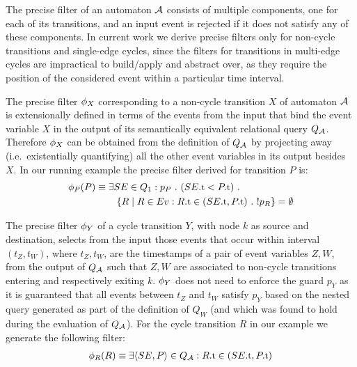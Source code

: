 





The precise filter of an automaton $\mathcal{A}$ consists of multiple components, one 
for each of its transitions, and an input event is rejected if it does not 
satisfy any of these components. 
In current work we derive precise filters only for non-cycle transitions and 
single-edge cycles, since the filters for transitions in multi-edge cycles 
are impractical to build/apply and abstract over, as they require the position 
of the considered event within a particular time interval.
 

The precise filter $\phi_{X}$ corresponding to a non-cycle transition $X$ of 
automaton $\mathcal{A}$ is extensionally defined in terms of the events 
from the input that bind the event variable $X$ in the output of its 
semantically equivalent relational query $Q_{\mathcal{A}}$. 
Therefore $\phi_{X}$ can be obtained from the definition of $Q_{\mathcal{A}}$ by 
projecting away (i.e.\ existentially quantifying) all the other event variables 
in its output besides $X$. 
In our running example the precise filter derived for transition $P$ is:
\begin{align*}
&\precs{P}(P) \equiv \exists SE \in Q_1:
p_P\ .\ (\facc{SE}{t} < \facc{P}{t})\ . 
\\ 
&\qqquad\quad
\{ R \mid R \in \Ev : \facc{R}{t} \in (\facc{SE}{t}, \facc{P}{t})\ .\ 
! p_R \} = \emptyset
\end{align*}

The precise filter $\phi_{Y}$ of a cycle transition $Y$, with node $k$ as 
source 
and destination, selects from the input those events that occur within interval 
$(t_Z, t_W)$, where $t_Z, t_W$, are the timestamps of a pair of event variables 
$Z, W$, from the output of $Q_{\mathcal{A}}$ such that $Z, W$ are associated to 
non-cycle transitions entering and respectively exiting $k$.
$\phi_{Y}$ does not need to enforce the guard $p_Y$ as it is 
guaranteed
that all events between $t_Z$ and $t_W$ satisfy $p_Y$ based on the
nested query generated as part of the definition of $Q_W$ (and which was found 
to hold during the evaluation of $Q_{\mathcal{A}}$).
For the cycle transition $R$ in our example we generate the following filter:
\begin{align*}
\precs{R}(R) \equiv \exists \tuple{SE,P} \in Q_{\cA}: 
 \facc{R}{t} \in (\facc{SE}{t}, \facc{P}{t})
\end{align*}
   



